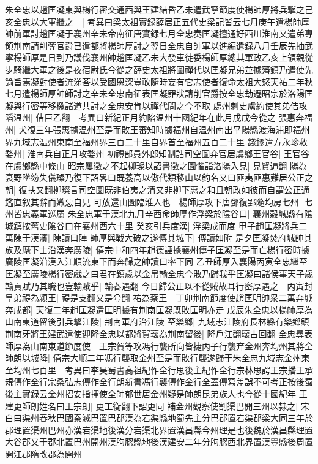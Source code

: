 朱全忠以趙匡凝東與楊行密交通西與王建結昏乙未遣武寧節度使楊師厚將兵撃之己亥全忠以大軍繼之　|{
	考異曰梁太祖實録薛居正五代史梁記皆云七月庚午遣楊師厚帥前軍討趙匡凝于襄州辛未帝南征唐實録七月全忠奏匡凝擅通好西川淮南又遣弟專領荆南請削奪官爵已遣都將楊師厚討之翌日全忠自帥軍以進編遺録八月壬辰先抽武寧楊師厚是日到乃議伐襄州帥趙匡凝乙未大發車徒委楊師厚總其軍政乙亥上領親從步騎繼大軍之後是夜宿尉氏今從之薛史太祖將圖禪代以匡凝兄弟並據藩鎮乃遣使先諭旨焉凝對使者流涕荅以受國恩深豈敢隨時妄有它志使者復命太祖大怒天祐二年秋七月遣楊師厚帥師討之辛未全忠南征表匡凝罪狀請削官爵按全忠劫遷昭宗於洛陽匡凝與行密等移檄諸道共討之全忠安肯以禪代問之今不取}
處州刺史盧約使其弟佶攻䧟温州|{
	佶巨乙翻　考異曰新紀正月約陷温州十國紀年在此月戊戌今從之}
張惠奔福州|{
	犬復三年張惠據温州至是而敗王審知時據福州自温州南出平陽縣渡海浦即福州界九域志温州東南至福州界三百二十里自界首至福州五百二十里}
錢鏐遣方永珍救婺州|{
	淮南兵自正月攻婺州}
初禮部員外郎知制誥司空圖弃官居虞鄉王官谷|{
	王官谷在虞鄉縣中條山}
昭宗屢徵之不起柳璨以詔書徵之圖懼詣洛陽入見|{
	見賢遍翻}
陽為衰野墜笏失儀璨乃復下詔畧曰既養高以傲代類移山以釣名又曰匪夷匪惠難居公正之朝|{
	復扶又翻柳璨言司空圖既非伯夷之清又非柳下惠之和且朝政如彼而自謂公正通鑑直叙其辭而媺惡自見}
可放還山圖臨淮人也　楊師厚攻下唐鄧復郢隨均房七州|{
	七州皆忠義軍巡屬}
朱全忠軍于漢北九月辛酉命師厚作浮梁於隂谷口|{
	襄州穀城縣有隂城鎮按舊史隂谷口在襄州西六十里}
癸亥引兵度漢|{
	浮梁成而度}
甲子趙匡凝將兵二萬陳于漢濱|{
	陳讀曰陣}
師厚與戰大破之遂傅其城下|{
	傅讀如附}
是夕匡凝焚府城帥其族及麾下士沿漢奔廣陵|{
	僖宗中和四年趙德諲據襄州傳子匡凝至是而亡楊行密時據廣陵匡凝沿漢入江順流東下而奔歸之帥讀曰率下同}
乙丑師厚入襄陽丙寅全忠繼至匡凝至廣陵楊行密戲之曰君在鎮歲以金帛輸全忠今敗乃歸我乎匡凝曰諸侯事天子歲輸貢賦乃其職也豈輸賊乎|{
	輸舂遇翻}
今日歸公正以不從賊故耳行密厚遇之　丙寅封皇弟禔為潁王|{
	禔是支翻又是兮翻}
祐為蔡王　丁卯荆南節度使趙匡明帥衆二萬弃城奔成都|{
	天復二年趙匡凝遣匡明據有荆南匡凝既敗匡明亦走}
戊辰朱全忠以楊師厚為山南東道留後引兵擊江陵|{
	荆南軍府治江陵}
至樂鄉|{
	九域志江陵府長林縣有樂鄉鎮}
荆南牙將王建武遣使迎降全忠以都將賀瓌為荆南留後|{
	降戶江翻瓌古回翻}
全忠尋表師厚為山南東道節度使　王宗賀等攻馮行襲所向皆捷丙子行襲弃金州奔均州其將全師朗以城降|{
	僖宗大順二年馮行襲取金州至是而敗行襲遂歸于朱全忠九域志金州東至均州七百里　考異曰李昊蜀書高祖紀作全行思後主紀作全行宗林思諤王宗播王承規傳作全行宗桑弘志傳作全行朗新書馮行襲傳作金行全蓋傳寫差誤不可考正按後蜀後主實録云金州招安指揮使全師郁世居金州疑是師朗昆弟族人也今從十國紀年}
王建更師朗姓名曰王宗朗|{
	更工衡翻下詔更同}
補金州觀察使割渠巴開三州以隸之|{
	宋白曰渠州春秋巴國秦滅巴置巴郡漢為宕渠縣地蜀先主分巴郡置宕渠郡梁大同三年於郡理置渠州巴州亦漢宕渠地後漢分宕渠北界置漢昌縣今州理是也後魏於漢昌縣理置大谷郡又于郡北置巴州開州漢朐䏰縣地後漢建安二年分朐䏰西北界置漢豐縣後周置開江郡隋改郡為開州}
